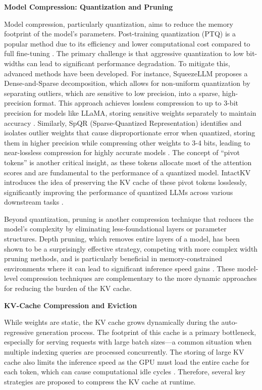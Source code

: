 \documentclass[11pt]{article}
\begin{document}
\textbf{Model Compression: Quantization and Pruning}

Model compression, particularly quantization, aims to reduce the memory footprint of the model's parameters. Post-training quantization (PTQ) is a popular method due to its efficiency and lower computational cost compared to full fine-tuning \cite{ref300}. The primary challenge is that aggressive quantization to low bit-widths can lead to significant performance degradation. To mitigate this, advanced methods have been developed. For instance, SqueezeLLM proposes a Dense-and-Sparse decomposition, which allows for non-uniform quantization by separating outliers, which are sensitive to low precision, into a sparse, high-precision format. This approach achieves lossless compression to up to 3-bit precision for models like LLaMA, storing sensitive weights separately to maintain accuracy \cite{ref245}. Similarly, SpQR (Sparse-Quantized Representation) identifies and isolates outlier weights that cause disproportionate error when quantized, storing them in higher precision while compressing other weights to 3-4 bits, leading to near-lossless compression for highly accurate models \cite{ref301}. The concept of ``pivot tokens'' is another critical insight, as these tokens allocate most of the attention scores and are fundamental to the performance of a quantized model. IntactKV introduces the idea of preserving the KV cache of these pivot tokens losslessly, significantly improving the performance of quantized LLMs across various downstream tasks \cite{ref302}.

Beyond quantization, pruning is another compression technique that reduces the model's complexity by eliminating less-foundational layers or parameter structures. Depth pruning, which removes entire layers of a model, has been shown to be a surprisingly effective strategy, competing with more complex width pruning methods, and is particularly beneficial in memory-constrained environments where it can lead to significant inference speed gains \cite{ref303}. These model-level compression techniques are complementary to the more dynamic approaches for reducing the burden of the KV cache.

\textbf{KV-Cache Compression and Eviction}

While weights are static, the KV cache grows dynamically during the auto-regressive generation process. The footprint of this cache is a primary bottleneck, especially for serving requests with large batch sizes---a common situation when multiple indexing queries are processed concurrently. The storing of large KV cache also limits the inference speed as the GPU must load the entire cache for each token, which can cause computational idle cycles \cite{ref298}. Therefore, several key strategies are proposed to compress the KV cache at runtime.
\end{document}
